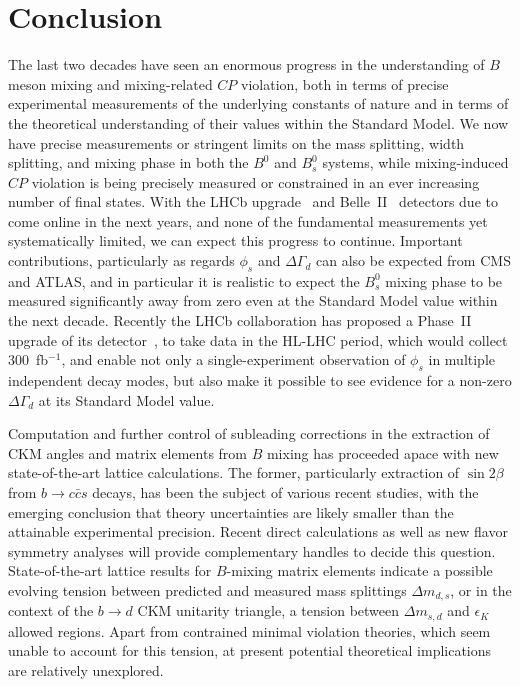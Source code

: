 \section{Conclusion}
The last two decades have seen an enormous progress in the understanding of $B$ meson mixing and mixing-related
$CP$ violation, both in terms of precise experimental measurements of the underlying constants of nature and in terms of 
the theoretical understanding of their values within the Standard Model. We now have precise measurements 
or stringent limits on the mass splitting, width splitting, and mixing phase in both the $B^0$ and $B^0_s$ systems,
while mixing-induced $CP$ violation is being precisely measured or constrained in an ever increasing number of final states.
With the LHCb upgrade~\cite{Bediaga:1443882} and Belle~II~\cite{Abe:2010gxa} detectors due to come online in the next years, and none of the fundamental measurements
yet systematically limited, we can expect this progress to continue. Important contributions, particularly as regards
$\phi_s$ and $\Delta\Gamma_d$ can also be expected from CMS and ATLAS, and in particular it is realistic to expect the $B^0_s$ mixing
phase to be measured significantly away from zero even at the Standard Model value within the next decade. Recently
the LHCb collaboration has proposed a Phase~II upgrade of its detector~\cite{Aaij:2244311}, to take data in the HL-LHC period,
which would collect 300~fb$^{-1}$, and enable not only a single-experiment observation of $\phi_s$ in multiple independent
decay modes, but also make it possible to see evidence for a non-zero $\Delta\Gamma_d$ at its Standard Model value.

Computation and further control of subleading corrections in the extraction of CKM angles and matrix elements from $B$ mixing has proceeded apace with new state-of-the-art lattice calculations. The former, particularly extraction of $\sin 2\beta$ from $b \to c\bar{c} s$ decays, has been the subject of various recent studies, with the emerging conclusion that theory uncertainties are likely smaller than the attainable experimental precision. Recent direct calculations as well as new flavor symmetry analyses will provide complementary handles to decide this question. State-of-the-art lattice results for $B$-mixing matrix elements indicate a possible evolving tension between predicted and measured mass splittings $\Delta m_{d,s}$, or in the context of the $b \to d$ CKM unitarity triangle, a tension between $\Delta m_{s,d}$ and $\epsilon_K$ allowed regions. Apart from contrained minimal violation theories, which seem unable to account for this tension, at present potential theoretical implications are relatively unexplored. 

